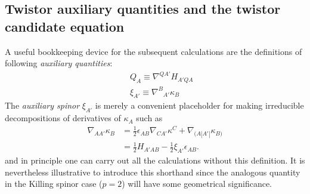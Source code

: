 \documentclass[10pt,a4paper]{article}
\theoremstyle{plain}
\begin{document}
  \subsection{Twistor auxiliary quantities and the twistor candidate equation}
A useful bookkeeping device for the subsequent
calculations are the definitions of following \emph{auxiliary quantities}:
\begin{subequations}
  \begin{eqnarray}
      && Q_{A}  \equiv \nabla^{QA'}H_{A'QA} \label{def_Q_twistor} \\
      && \xi_{A'} \equiv \nabla^B{}_{A'}\kappa_B \label{def_xi_twistor}
  \end{eqnarray}
\end{subequations}
  The \emph{auxiliary spinor} $\xi_{A'}$ is merely a convenient
  placeholder for making irreducible decompositions of derivatives of
  $\kappa_A$ such as
  \begin{align}\label{decomp_Der_kappa}
    \nabla_{AA'}\kappa _{B} & = \tfrac{1}{2} \epsilon _{AB}
    \nabla_{CA'}\kappa ^{C} + \nabla_{(A|A'|}\kappa _{B)}\nonumber
 \\ & = \tfrac{1}{2} H_{A'AB} - \tfrac{1}{2} \xi _{A'} \epsilon_{AB}.
  \end{align}
  and in principle one can carry out all the calculations without this
  definition. It is nevertheless illustrative to introduce this
  shorthand since the analogous quantity in the Killing spinor case
  ($p=2$) will have some geometrical significance.

  \medskip
  
\end{document}
